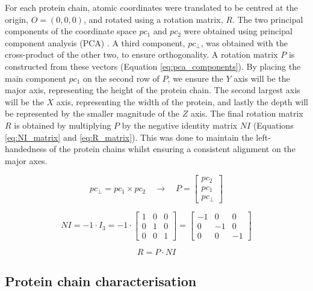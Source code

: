 For each protein chain, atomic coordinates were translated to be centred at the origin, $O = (0, 0, 0)$, and rotated using a rotation matrix, $R$. The two principal components of the coordinate space $pc_{1}$ and $pc_{2}$ were obtained using principal component analysis (PCA) \cite{HOTELLING_1933_PCA}. A third component, $pc_{\perp}$, was obtained with the cross-product of the other two, to ensure orthogonality. A rotation matrix $P$ is constructed from these vectors (Equation \ref{eq:pca_components}). By placing the main component $pc_{1}$ on the second row of $P$, we ensure the $Y$ axis will be the major axis, representing the height of the protein chain. The second largest axis will be the $X$ axis, representing the width of the protein, and lastly the depth will be represented by the smaller magnitude of the $Z$ axis. The final rotation matrix $R$ is obtained by multiplying $P$ by the negative identity matrix $NI$ (Equations \ref{eq:NI_matrix} and \ref{eq:R_matrix}). This was done to maintain the left-handedness of the protein chains whilst ensuring a consistent alignment on the major axes.

\begin{equation}
pc_{\perp} = pc_{1} \times pc_{2} \quad \rightarrow \quad P = \begin{bmatrix}
pc_{2} \\
pc_{1} \\
pc_{\perp}
\end{bmatrix}
\label{eq:pca_components}
\end{equation}

\begin{equation}
NI = -1 \cdot I_3 = -1 \cdot \begin{bmatrix}
1 & 0 & 0 \\
0 & 1 & 0 \\
0 & 0 & 1 
\end{bmatrix} = \begin{bmatrix}
-1 & 0 & 0 \\
0 & -1 & 0 \\
0 & 0 & -1 
\end{bmatrix}
\label{eq:NI_matrix}
\end{equation}

\begin{equation}
R = P \cdot NI
\label{eq:R_matrix}
\end{equation}

\subsection{Protein chain characterisation}

